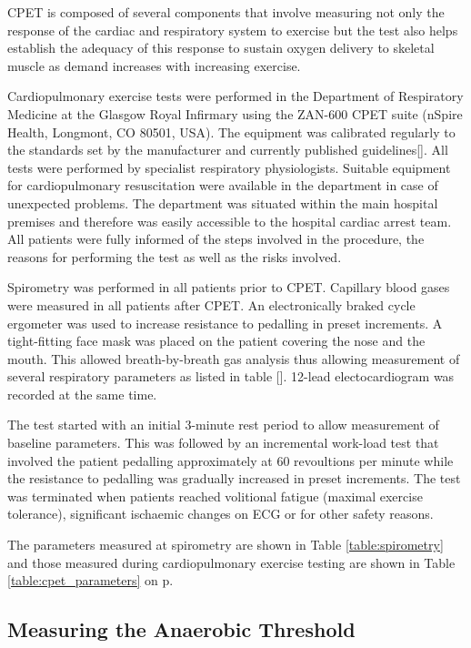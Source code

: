 CPET is composed of several components that involve measuring not only the response of the cardiac and respiratory system to exercise but the test also helps establish the adequacy of this response to sustain oxygen delivery to skeletal muscle as demand increases with increasing exercise. 

Cardiopulmonary exercise tests were performed in the Department of Respiratory Medicine at the Glasgow Royal Infirmary using the ZAN-600 CPET suite (nSpire Health, Longmont, CO 80501, USA). The equipment was calibrated regularly to the standards set by the manufacturer and currently published guidelines[]. All tests were performed by specialist respiratory physiologists. Suitable equipment for cardiopulmonary resuscitation were available in the department in case of unexpected problems. The department was situated within the main hospital premises and therefore was easily accessible to the hospital cardiac arrest team. All patients were fully informed of the steps involved in the procedure, the reasons for performing the test as well as the risks involved. 

Spirometry was performed in all patients prior to CPET. Capillary blood gases were measured in all patients after CPET. An electronically braked cycle ergometer was used to increase resistance to pedalling in preset increments. A tight-fitting face mask was placed on the patient covering the nose and the mouth. This allowed breath-by-breath gas analysis thus allowing measurement of several respiratory parameters as listed in table []. 12-lead electocardiogram was recorded at the same time. 

The test started with an initial 3-minute rest period to allow measurement of baseline parameters. This was followed by an incremental work-load test that involved the patient pedalling approximately at 60 revoultions per minute while the resistance to pedalling was gradually increased in preset increments. The test was terminated when patients reached volitional fatigue (maximal exercise tolerance), significant ischaemic changes on ECG or for other safety reasons. 

The parameters measured at spirometry are shown in Table \ref{table:spirometry} and those measured during cardiopulmonary exercise testing are shown in Table \ref{table:cpet_parameters} on p\pageref{table:cpet_parameters}.

\subsection{Measuring the Anaerobic Threshold}

